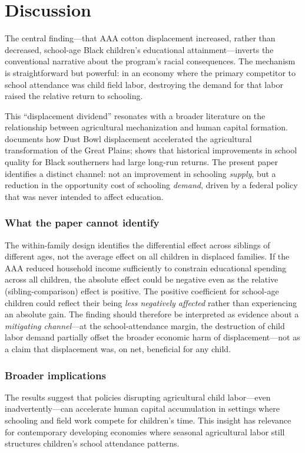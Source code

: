 \documentclass[12pt]{article}
\begin{document}
\section{Discussion}

The central finding---that AAA cotton displacement increased, rather than decreased, school-age Black children's educational attainment---inverts the conventional narrative about the program's racial consequences. The mechanism is straightforward but powerful: in an economy where the primary competitor to school attendance was child field labor, destroying the demand for that labor raised the relative return to schooling.

This ``displacement dividend'' resonates with a broader literature on the relationship between agricultural mechanization and human capital formation. \citet{hornbeck2012enduring} documents how Dust Bowl displacement accelerated the agricultural transformation of the Great Plains; \citet{aaronson2012effects} shows that historical improvements in school quality for Black southerners had large long-run returns. The present paper identifies a distinct channel: not an improvement in schooling \textit{supply}, but a reduction in the opportunity cost of schooling \textit{demand}, driven by a federal policy that was never intended to affect education.

\subsubsection*{What the paper cannot identify} The within-family design identifies the differential effect across siblings of different ages, not the average effect on all children in displaced families. If the AAA reduced household income sufficiently to constrain educational spending across all children, the absolute effect could be negative even as the relative (sibling-comparison) effect is positive. The positive coefficient for school-age children could reflect their being \textit{less negatively affected} rather than experiencing an absolute gain. The finding should therefore be interpreted as evidence about a \textit{mitigating channel}---at the school-attendance margin, the destruction of child labor demand partially offset the broader economic harm of displacement---not as a claim that displacement was, on net, beneficial for any child.

\subsubsection*{Broader implications} The results suggest that policies disrupting agricultural child labor---even inadvertently---can accelerate human capital accumulation in settings where schooling and field work compete for children's time. This insight has relevance for contemporary developing economies where seasonal agricultural labor still structures children's school attendance patterns.
\end{document}
